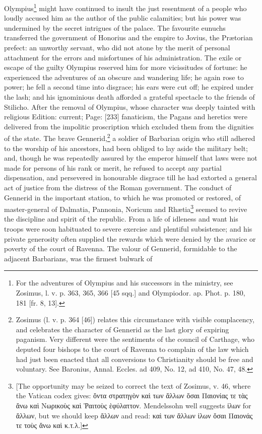 Olympius\footnote{For the adventures of Olympius and his successors in the ministry, see Zosimus, l. v. p. 363, 365, 366 [45 sqq.] and Olympiodor. ap. Phot. p. 180, 181 [fr. 8, 13].} might have continued to insult the just resentment of a people who loudly accused him as the author of the public calamities; but his power was undermined by the secret intrigues of the palace. The favourite eunuchs transferred the government of Honorius and the empire to Jovius, the Prætorian prefect: an unworthy servant, who did not atone by the merit of personal attachment for the errors and misfortunes of his administration. The exile or escape of the guilty Olympius reserved him for more vicissitudes of fortune: he experienced the adventures of an obscure and wandering life; he again rose to power; he fell a second time into disgrace; his ears were cut off; he expired under the lash; and his ignominious death afforded a grateful spectacle to the friends of Stilicho. After the removal of Olympius, whose character was deeply tainted with religious Edition: current; Page: [233] fanaticism, the Pagans and heretics were delivered from the impolitic proscription which excluded them from the dignities of the state. The brave Gennerid,\footnote{Zosimus (l. v. p. 364 [46]) relates this circumstance with visible complacency, and celebrates the character of Gennerid as the last glory of expiring paganism. Very different were the sentiments of the council of Carthage, who deputed four bishops to the court of Ravenna to complain of the law which had just been enacted that all conversions to Christianity should be free and voluntary. See Baronius, Annal. Eccles. ad 409, No. 12, ad 410, No. 47, 48.} a soldier of Barbarian origin who still adhered to the worship of his ancestors, had been obliged to lay aside the military belt; and, though he was repeatedly assured by the emperor himself that laws were not made for persons of his rank or merit, he refused to accept any partial dispensation, and persevered in honourable disgrace till he had extorted a general act of justice from the distress of the Roman government. The conduct of Gennerid in the important station, to which he was promoted or restored, of master-general of Dalmatia, Pannonia, Noricum and Rhætia\footnote{[The opportunity may be seized to correct the text of Zosimus, v. 46, where the Vatican codex gives: \textgreek{\texthebrew{ὄ}ντα στρατηγ\texthebrew{ὸ}ν κα\texthebrew{ὶ} των \texthebrew{ἄ}λλων \texthebrew{ὅ}σαι Παιονίας τε τ\texthebrew{ὰ}ς \texthebrew{ἄ}νω κα\texthebrew{ὶ} Νωρικο\texthebrew{ὺ}ς κα\texthebrew{ὶ Ῥ}αιτο\texthebrew{ὺ}ς \texthebrew{ὲ}φύλαττον}. Mendelssohn well suggests \textgreek{\texthebrew{ἰ}λων} for \textgreek{\texthebrew{ἄ}λλων}, but we should keep \textgreek{\texthebrew{ἄ}λλων} and read: \textgreek{κα\texthebrew{ὶ} των \texthebrew{ἄ}λλων \texthebrew{ἰ}λων \texthebrew{ὅ}σαι Παιονάς τε το\texthebrew{ὺ}ς \texthebrew{ἄ}νω κα\texthebrew{ὶ} κ.τ.λ}.]} seemed to revive the discipline and spirit of the republic. From a life of idleness and want his troops were soon habituated to severe exercise and plentiful subsistence; and his private generosity often supplied the rewards which were denied by the avarice or poverty of the court of Ravenna. The valour of Gennerid, formidable to the adjacent Barbarians, was the firmest bulwark of 